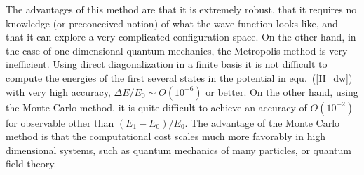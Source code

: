 \vspace*{0.3cm} 
 The advantages of this method are that it is extremely robust, that it 
requires no knowledge (or preconceived notion) of what the wave function 
looks like, and that it can explore a very complicated configuration space.
On the other hand, in the case of one-dimensional quantum mechanics, the 
Metropolis method is very inefficient. Using direct diagonalization in a 
finite basis it is not difficult to compute the energies of the first 
several states in the potential in equ.~(\ref{H_dw}) with very high accuracy, 
$\Delta E/E_0 \sim O(10^{-6})$ or better. On the other hand, using the 
Monte Carlo method, it is quite difficult to achieve an accuracy of 
$O(10^{-2})$ for observable other than $(E_1-E_0)/E_0$. The advantage of the 
Monte Carlo method is that the computational cost scales much more 
favorably in high dimensional systems, such as quantum mechanics of 
many particles, or quantum field theory.

